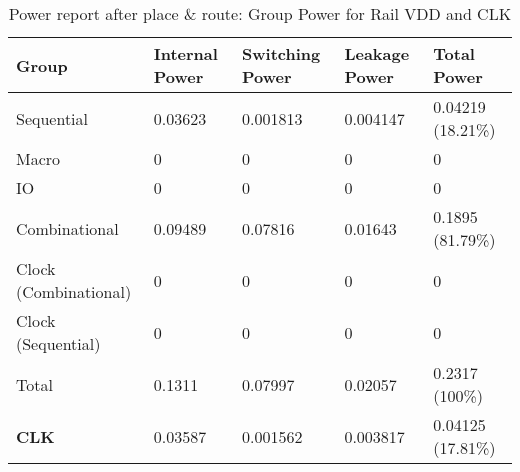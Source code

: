 \begin{table}
	\centering
\begin{tabular}{|l|l|l|l|l|}
	\hline
\textbf{Group}                &           \textbf{Internal  Power} &  \textbf{Switching  Power}  &   \textbf{Leakage  Power}     & \textbf{Total  Power} \\
\hline
Sequential       &                  0.03623  &  0.001813  &  0.004147   &  0.04219 (18.21\%)  \\
Macro                       &           0    &       0       &    0      &     0  \\
IO                         &            0       &    0     &      0      &     0 \\
Combinational                &     0.09489  &   0.07816  &   0.01643   &   0.1895 (81.79\%)  \\
Clock (Combinational)        &          0      &     0     &      0    &       0  \\
Clock (Sequential)             &        0     &      0      &     0     &      0 \\
\hline
Total                      &      0.1311  &   0.07997  &   0.02057   &   0.2317 (100\%) \\\hline
\hline
\textbf{CLK}                         &    0.03587 &   0.001562  &  0.003817  &   0.04125 (17.81\%) \\\hline
\end{tabular}
\caption{Power report after place \& route: Group Power for Rail VDD and CLK}
\label{tab:post_pr_power_report}
\end{table}